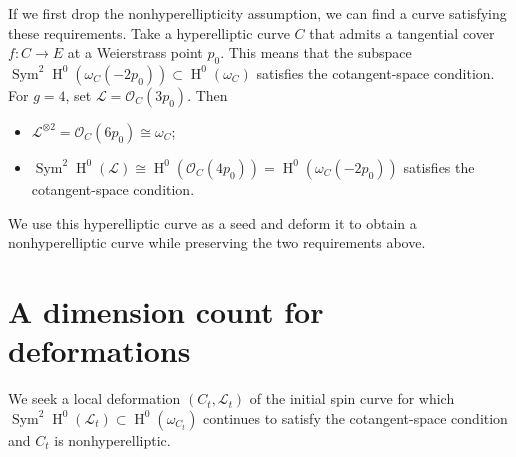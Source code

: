 \documentclass[UTF8]{amsart}
\numberwithin{equation}{section}
\theoremstyle{plain}
\numberwithin{equation}{section}
\theoremstyle{remark}
\DeclareMathOperator{\Sym}{\operatorname{Sym}}
\DeclareMathOperator{\Hnm}{\operatorname{H}}
\begin{document}
If we first drop the nonhyperellipticity assumption, we can find a curve satisfying these requirements. Take a hyperelliptic curve $C$ that admits a tangential cover $f:C \longrightarrow E$ at a Weierstrass point $p_0$. This means that the subspace $\Sym^2 \Hnm^0(\omega_C(-2p_0)) \subset \Hnm^0(\omega_C)$ satisfies the cotangent-space condition. For $g=4$, set $\mathcal{L}=\mathcal{O}_C(3p_0)$. Then
\begin{itemize}
\item $\mathcal{L}^{\otimes 2}= \mathcal{O}_C(6p_0) \cong \omega_C$;
\item $\Sym^2 \Hnm^0(\mathcal{L}) \cong \Hnm^0\left(\mathcal{O}_C(4p_0)\right) = \Hnm^0\left(\omega_C(-2p_0)\right)$ satisfies the cotangent-space condition.
\end{itemize}
We use this hyperelliptic curve as a seed and deform it to obtain a nonhyperelliptic curve while preserving the two requirements above.

\section{A dimension count for deformations}

We seek a local deformation $(C_t,\mathcal{L}_t)$ of the initial spin curve for which $\Sym^2 \Hnm^0(\mathcal{L}_t) \subset \Hnm^0(\omega_{C_t})$ continues to satisfy the cotangent-space condition and $C_t$ is nonhyperelliptic.
\end{document}
